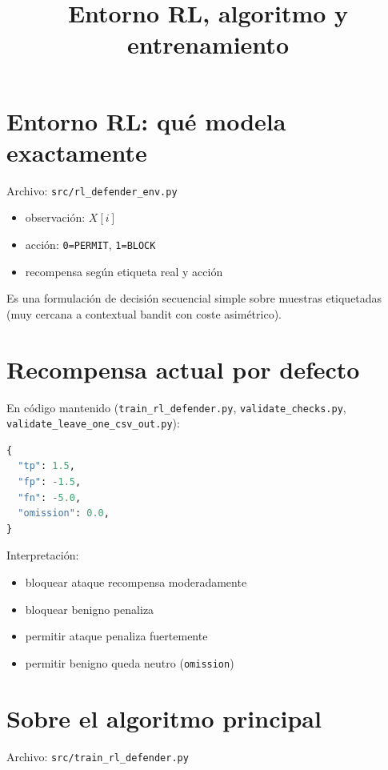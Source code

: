 ﻿\documentclass[12pt,a4paper]{article}
\title{Entorno RL, algoritmo y entrenamiento}
\date{}
\begin{document}
\maketitle

\section{Entorno RL: qué modela exactamente}

Archivo: \verb|src/rl_defender_env.py|

\begin{itemize}
  \item observación: \(X[i]\)
  \item acción: \texttt{0=PERMIT}, \texttt{1=BLOCK}
  \item recompensa según etiqueta real y acción
\end{itemize}

Es una formulación de decisión secuencial simple sobre muestras etiquetadas (muy cercana a contextual
bandit con coste asimétrico).

\section{Recompensa actual por defecto}

En código mantenido (\verb|train_rl_defender.py|, \verb|validate_checks.py|,
\verb|validate_leave_one_csv_out.py|):

\begin{lstlisting}[language=Python]
{
  "tp": 1.5,
  "fp": -1.5,
  "fn": -5.0,
  "omission": 0.0,
}
\end{lstlisting}

Interpretación:

\begin{itemize}
  \item bloquear ataque recompensa moderadamente
  \item bloquear benigno penaliza
  \item permitir ataque penaliza fuertemente
  \item permitir benigno queda neutro (\texttt{omission})
\end{itemize}

\section{Sobre el algoritmo principal}

Archivo: \verb|src/train_rl_defender.py|
\end{document}
